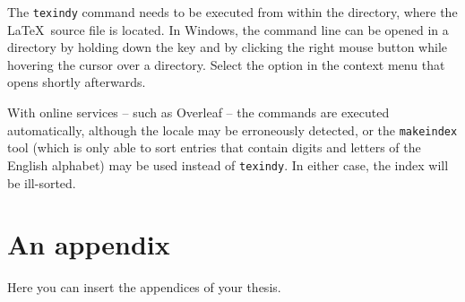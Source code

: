 \documentclass[
  digital, %
  table,   %
  lof,     %
  lot,     %
]{fithesis3}
\begin{document}
The \texttt{texindy} command needs to be executed from within the
directory, where the \LaTeX\ source file is located. In Windows,
the command line can be opened in a directory by holding down the
 key and by clicking the right mouse button while
hovering the cursor over a directory. Select the  option in the context menu that opens shortly
afterwards.

With online services -- such as Overleaf -- the commands are
executed automatically, although the locale may be erroneously
detected, or the \texttt{makeindex} tool (which is only able to
sort entries that contain digits and letters of the English
alphabet) may be used instead of \texttt{texindy}. In either case,
the index will be ill-sorted.

\makeatletter\thesis@blocks@clear\makeatother
{} %
\printindex

\makeatletter\thesis@blocks@clear\makeatother
\renewcommand{\theHchapter}{A\arabic{chapter}}
\appendix %

\chapter{An appendix}
Here you can insert the appendices of your thesis.
\end{document}
